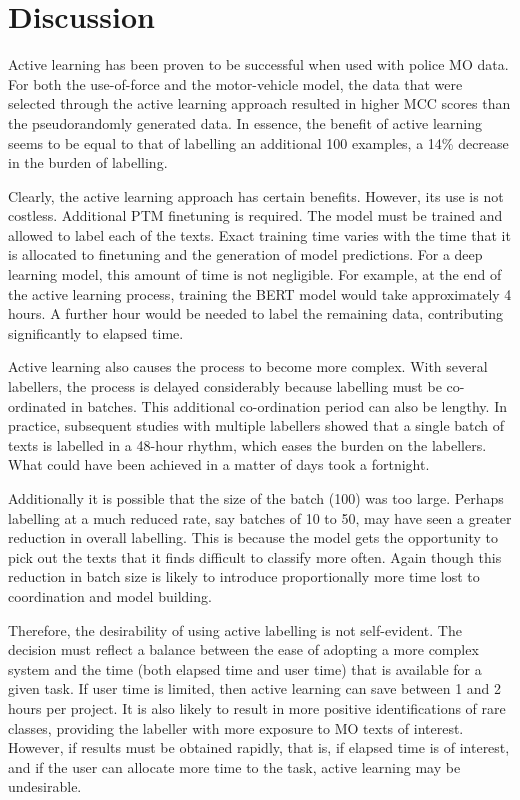 \section{Discussion} Active learning has been proven to be successful when used with police MO data. For both the use-of-force and the motor-vehicle model, the data that were selected through the active learning approach resulted in higher MCC scores than the pseudorandomly generated data. In essence, the benefit of active learning seems to be equal to that of labelling an additional 100 examples, a 14\% decrease in the burden of labelling.

Clearly, the active learning approach has certain benefits. However, its use is not costless. Additional PTM finetuning is required. The model must be trained and allowed to label each of the texts. Exact training time varies with the time that it is allocated to finetuning and the generation of model predictions. For a deep learning model, this amount of time is not negligible. For example, at the end of the active learning process, training the BERT model would take approximately 4 hours. A further hour would be needed to label the remaining data, contributing significantly to elapsed time.

Active learning also causes the process to become more complex. With several labellers, the process is delayed considerably because labelling must be co-ordinated in batches. This additional co-ordination period can also be lengthy. In practice, subsequent studies with multiple labellers showed that a single batch of texts is labelled in a 48-hour rhythm, which eases the burden on the labellers. What could have been achieved in a matter of days took a fortnight.

Additionally it is possible that the size of the batch (100) was too large. Perhaps labelling at a much reduced rate, say batches of 10 to 50, may have seen a greater reduction in overall labelling. This is because the model gets the opportunity to pick out the texts that it finds difficult to classify more often. Again though this reduction in batch size is likely to introduce proportionally more time lost to coordination and model building.

Therefore, the desirability of using active labelling is not self-evident. The decision must reflect a balance between the ease of adopting a more complex system and the time (both elapsed time and user time) that is available for a given task. If user time is limited, then active learning can save between 1 and 2 hours per project. It is also likely to result in more positive identifications of rare classes, providing the labeller with more exposure to MO texts of interest. However, if results must be obtained rapidly, that is, if elapsed time is of interest, and if the user can allocate more time to the task, active learning may be undesirable. 


